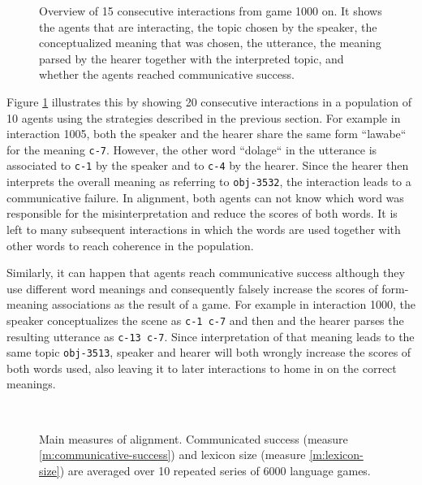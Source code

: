 \begin{figure}[t]
  
  \caption{Overview of 15 consecutive interactions from game 1000
    on. It shows the agents that are interacting, the topic chosen by
    the speaker, the conceptualized meaning that was chosen, the
    utterance, the meaning parsed by the hearer together with the
    interpreted topic, and whether the agents reached communicative
    success.}
  \label{f:sgg-mw-unstructured-trace}
\end{figure}

Figure \ref{f:sgg-mw-unstructured-trace} illustrates this by showing
20 consecutive interactions in a population of 10 agents using the
strategies described in the previous section. For example in
interaction 1005, both the speaker and the hearer share the same form
``lawabe`` for the meaning \texttt{c-7}. However, the other word
``dolage`` in the utterance is associated to \texttt{c-1} by the
speaker and to \texttt{c-4} by the hearer. Since the hearer then
interprets the overall meaning as referring to \texttt{obj-3532}, the
interaction leads to a communicative failure. In alignment, both
agents can not know which word was responsible for the
misinterpretation and reduce the scores of both words. It is left to
many subsequent interactions in which the words are used together with
other words to reach coherence in the population.

Similarly, it can happen that agents reach communicative success
although they use different word meanings and consequently falsely
increase the scores of form-meaning associations as the result of a
game. For example in interaction 1000, the speaker conceptualizes the
scene as \texttt{c-1 c-7} and then and the hearer parses the resulting
utterance as \texttt{c-13 c-7}. Since interpretation of that meaning
leads to the same topic \texttt{obj-3513}, speaker and hearer will
both wrongly increase the scores of both words used, also leaving it
to later interactions to home in on the correct meanings.

~\\



\startfiguregroup

\begin{figure}[t]
  \caption{Main measures of alignment. Communicated success (measure
    \ref{m:communicative-success}) and lexicon size (measure
    \ref{m:lexicon-size}) are averaged over 10 repeated series of 6000
    language games.}
  \label{f:sgg-mw-unstructured-success+lexicon-size}
\end{figure}


